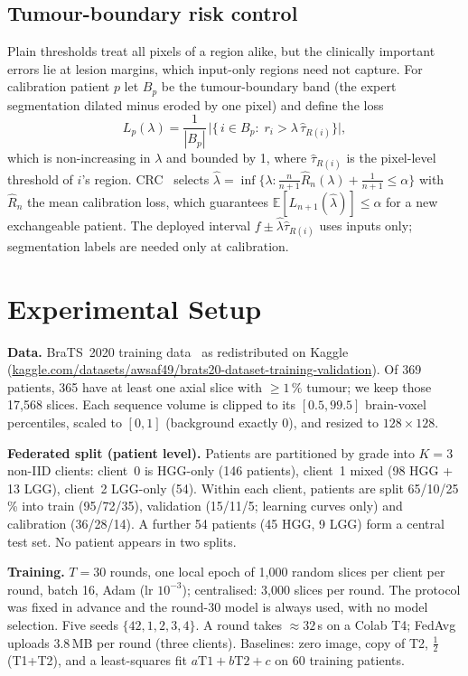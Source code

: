 \documentclass[conference]{IEEEtran}
\begin{document}
\subsection{Tumour-boundary risk control}
Plain thresholds treat all pixels of a region alike, but the clinically important errors lie at lesion margins, which input-only regions need not capture. For calibration patient $p$ let $B_p$ be the tumour-boundary band (the expert segmentation dilated minus eroded by one pixel) and define the loss
\begin{equation}
L_p(\lambda)=\frac{1}{|B_p|}\,\Big|\{\,i\in B_p:\; r_i>\lambda\,\hat\tau_{R(i)}\}\Big|,
\end{equation}
which is non-increasing in $\lambda$ and bounded by 1, where $\hat\tau_{R(i)}$ is the pixel-level threshold of $i$'s region. CRC~\cite{angelopoulos2022crc} selects $\hat\lambda=\inf\{\lambda: \tfrac{n}{n+1}\hat R_n(\lambda)+\tfrac{1}{n+1}\le\alpha\}$ with $\hat R_n$ the mean calibration loss, which guarantees $\mathbb{E}[L_{n+1}(\hat\lambda)]\le\alpha$ for a new exchangeable patient. The deployed interval $f\pm\hat\lambda\hat\tau_{R(i)}$ uses inputs only; segmentation labels are needed only at calibration.

\section{Experimental Setup}
\label{sec:setup}

\noindent\textbf{Data.} BraTS~2020 training data~\cite{menze2015brats,bakas2017brats} as redistributed on Kaggle (\url{kaggle.com/datasets/awsaf49/brats20-dataset-training-validation}). Of 369 patients, 365 have at least one axial slice with $\geq 1\,\%$ tumour; we keep those 17{,}568 slices. Each sequence volume is clipped to its $[0.5, 99.5]$ brain-voxel percentiles, scaled to $[0,1]$ (background exactly 0), and resized to $128{\times}128$.

\noindent\textbf{Federated split (patient level).} Patients are partitioned by grade into $K{=}3$ non-IID clients: client~0 is HGG-only (146 patients), client~1 mixed (98 HGG + 13 LGG), client~2 LGG-only (54). Within each client, patients are split 65/10/25\,\% into train (95/72/35), validation (15/11/5; learning curves only) and calibration (36/28/14). A further 54 patients (45 HGG, 9 LGG) form a central test set. No patient appears in two splits.

\noindent\textbf{Training.} $T{=}30$ rounds, one local epoch of 1{,}000 random slices per client per round, batch 16, Adam (lr $10^{-3}$); centralised: 3{,}000 slices per round. The protocol was fixed in advance and the round-30 model is always used, with no model selection. Five seeds $\{42,1,2,3,4\}$. A round takes $\approx 32$\,s on a Colab T4; FedAvg uploads 3.8\,MB per round (three clients). Baselines: zero image, copy of T2, $\tfrac12$(T1+T2), and a least-squares fit $a\text{T1}+b\text{T2}+c$ on 60 training patients.
\end{document}
